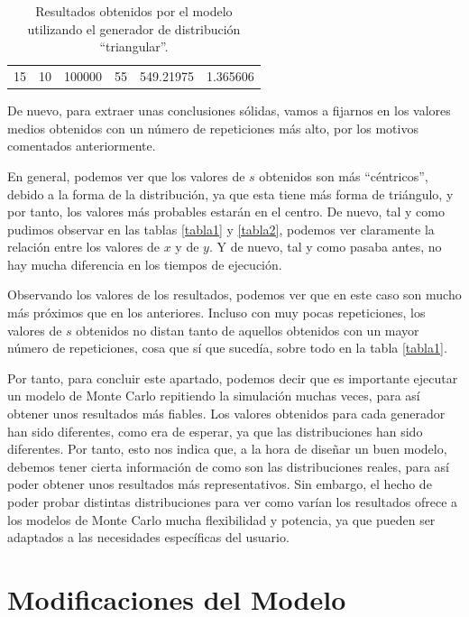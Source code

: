 \documentclass[11pt,a4paper]{report}
\begin{document}
\begin{table}[H]
{\begin{tabular}{c|c|c|c|c|c}
15                                                                                   & 10                                                                                     & 100000                                                                    & 55                                                                                        & 549.21975                                                                 & 1.365606             
\end{tabular}%
}
\caption{Resultados obtenidos por el modelo utilizando el generador de distribución ``triangular''.}
\label{tabla3}
\end{table}

De nuevo, para extraer unas conclusiones sólidas, vamos a fijarnos en los valores medios obtenidos con un número de repeticiones
más alto, por los motivos comentados anteriormente.

En general, podemos ver que los valores de $s$ obtenidos son más ``céntricos'', debido a la forma de la distribución, ya que
esta tiene más forma de triángulo, y por tanto, los valores más probables estarán en el centro. De nuevo, tal y como pudimos
observar en las tablas \ref{tabla1} y \ref{tabla2}, podemos ver claramente la relación entre los valores de $x$ y de $y$.
Y de nuevo, tal y como pasaba antes, no hay mucha diferencia en los tiempos de ejecución.

Observando los valores de los resultados, podemos ver que en este caso son mucho más próximos que en los anteriores. Incluso
con muy pocas repeticiones, los valores de $s$ obtenidos no distan tanto de aquellos obtenidos con un mayor número de repeticiones,
cosa que sí que sucedía, sobre todo en la tabla \ref{tabla1}.

Por tanto, para concluir este apartado, podemos decir que es importante ejecutar un modelo de Monte Carlo repitiendo
la simulación muchas veces, para así obtener unos resultados más fiables. Los valores obtenidos para cada generador han
sido diferentes, como era de esperar, ya que las distribuciones han sido diferentes. Por tanto, esto nos indica que, a la
hora de diseñar un buen modelo, debemos tener cierta información de como son las distribuciones reales, para así poder
obtener unos resultados más representativos. Sin embargo, el hecho de poder probar distintas distribuciones para ver como
varían los resultados ofrece a los modelos de Monte Carlo mucha flexibilidad y potencia, ya que pueden ser adaptados a
las necesidades específicas del usuario.

\section{Modificaciones del Modelo}
\end{document}
